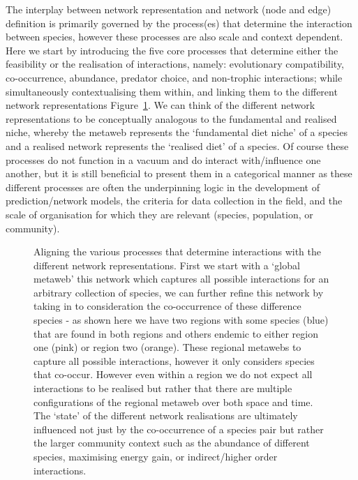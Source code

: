 \documentclass[
]{article}
\makeatletter
\newcommand*\pandocbounded[1]{%
  \sbox\pandoc@box{#1}%
  \Gscale@div\@tempa{\textheight}{\dimexpr\ht\pandoc@box+\dp\pandoc@box\relax}%
  \Gscale@div\@tempb{\linewidth}{\wd\pandoc@box}%
  \ifdim\@tempb\p@<\@tempa\p@\let\@tempa\@tempb\fi%
  \ifdim\@tempa\p@<\p@\scalebox{\@tempa}{\usebox\pandoc@box}%
  \else\usebox{\pandoc@box}%
  \fi%
}
\makeatother
\begin{document}
The interplay between network representation and network (node and edge)
definition is primarily governed by the process(es) that determine the
interaction between species, however these processes are also scale and
context dependent. Here we start by introducing the five core processes
that determine either the feasibility or the realisation of
interactions, namely: evolutionary compatibility, co-occurrence,
abundance, predator choice, and non-trophic interactions; while
simultaneously contextualising them within, and linking them to the
different network representations Figure~\ref{fig-process}. We can think
of the different network representations to be conceptually analogous to
the fundamental and realised niche, whereby the metaweb represents the
`fundamental diet niche' of a species and a realised network represents
the `realised diet' of a species. Of course these processes do not
function in a vacuum and do interact with/influence one another, but it
is still beneficial to present them in a categorical manner as these
different processes are often the underpinning logic in the development
of prediction/network models, the criteria for data collection in the
field, and the scale of organisation for which they are relevant
(species, population, or community).

\begin{figure}

\centering{

\pandocbounded{\texttt{[image: images/representations.png]}}

}

\caption{\label{fig-process}Aligning the various processes that
determine interactions with the different network representations. First
we start with a `global metaweb' this network which captures all
possible interactions for an arbitrary collection of species, we can
further refine this network by taking in to consideration the
co-occurrence of these difference species - as shown here we have two
regions with some species (blue) that are found in both regions and
others endemic to either region one (pink) or region two (orange). These
regional metawebs to capture all possible interactions, however it only
considers species that co-occur. However even within a region we do not
expect all interactions to be realised but rather that there are
multiple configurations of the regional metaweb over both space and
time. The `state' of the different network realisations are ultimately
influenced not just by the co-occurrence of a species pair but rather
the larger community context such as the abundance of different species,
maximising energy gain, or indirect/higher order interactions.}

\end{figure}%
\end{document}
